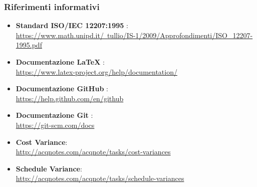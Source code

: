 		\subsubsection{Riferimenti informativi}
			\begin{itemize}
				\item\textbf{Standard ISO/IEC 12207:1995} : \\
				\href{https://www.math.unipd.it/~tullio/IS-1/2009/Approfondimenti/ISO\_12207-1995.pdf}{https://www.math.unipd.it/~tullio/IS-1/2009/Approfondimenti/ISO\_12207-1995.pdf}
				\item\textbf{Documentazione LaTeX} : \\
				\href{ https://www.latex-project.org/help/documentation/}{ https://www.latex-project.org/help/documentation/}
				\item\textbf{Documentazione GitHub} : \\
				\href{ https://help.github.com/en/github}{ https://help.github.com/en/github}
				\item\textbf{Documentazione Git} : \\
				\href{ https://git-scm.com/docs}{ https://git-scm.com/docs}
				\item\textbf{Cost Variance}: \\
				\href{http://acqnotes.com/acqnote/tasks/cost-variances}{http://acqnotes.com/acqnote/tasks/cost-variances}
				\item\textbf{Schedule Variance}: \\
				\href{http://acqnotes.com/acqnote/tasks/schedule-variances}{http://acqnotes.com/acqnote/tasks/schedule-variances}
			\end{itemize}
\newpage
		
		
		
		
		
		
		
		
		
		
		
		
		
		
		
		
		
		
		
		
		
		
		